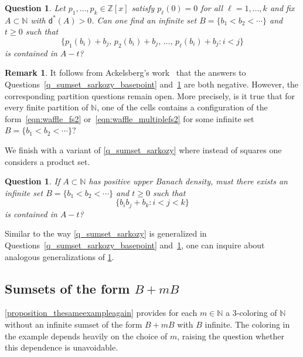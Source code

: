\documentclass[10pt,dvipsnames]{article}
\newtheorem{question}[theorem]{Question}
\theoremstyle{definition}
\newtheorem{remark}[theorem]{Remark}
\theoremstyle{plain}
\newcommand{\Z}{\mathbb{Z}}
\newcommand{\N}{\mathbb{N}}
\newcommand{\ubdens}{\mathsf{d}^*}
\begin{document}
\begin{question}\label{q_sumset_polynomials}
Let $p_1,\dots,p_k\in\Z[x]$ satisfy $p_\ell(0)=0$ for all $\ell=1,\dots,k$ and fix $A\subset\N$ with $\ubdens(A)>0$.
Can one find an infinite set $B = \{ b_1 < b_2 < \cdots \}$ and $t \ge 0$ such that
\begin{equation}
    \label{eqn:waffle_multiplefs2}
\big\{ p_1(b_i) + b_j,\, p_2(b_i) + b_j,\, \ldots,\, p_\ell(b_i) + b_j: i < j\big\}
\end{equation}
is contained in $A-t$?
\end{question}
\begin{remark}
It follows from Ackelsberg's work~\cite{ackelsberg} that the answers to Questions~\ref{q_sumset_sarkozy_basepoint} and~\ref{q_sumset_polynomials} are both negative. However, the corresponding partition questions remain open. More precisely, is it true that for every finite partition of $\N$, one of the cells contains a configuration of the form~\eqref{eqn:waffle_fs2} or~\eqref{eqn:waffle_multiplefs2} for some infinite set $B=\{b_1<b_2<\cdots\}$?
\end{remark}


We finish with a variant of \cref{q_sumset_sarkozy} where instead of squares one considers a product set.
\begin{question}
\label{q_sumset_itereated_sarkozy}
If $A\subset\N$ has positive upper Banach density, must there exists an infinite set $B=\{b_1< b_2<\cdots\}$ and $t\geq 0$ such that
\begin{equation*}
\{b_ib_j+b_k: i<j<k\}
\end{equation*}
is contained in $A-t$?
\end{question}
Similar to the way \cref{q_sumset_sarkozy} is generalized in  Questions~\ref{q_sumset_sarkozy_basepoint} and~\ref{q_sumset_polynomials}, one can inquire about analogous generalizations of \cref{q_sumset_itereated_sarkozy}.

\subsection{Sumsets of the form \texorpdfstring{$B+mB$}{B+mB}}
\label{sec:general-equations}


\cref{proposition_thesameexampleagain} provides for each $m\in\N$ a $3$-coloring of $\N$ without an infinite sumset of the form $B+mB$ with $B$ infinite. 
The coloring in the example depends heavily on the choice of $m$, raising the question whether this dependence is unavoidable.
\end{document}

